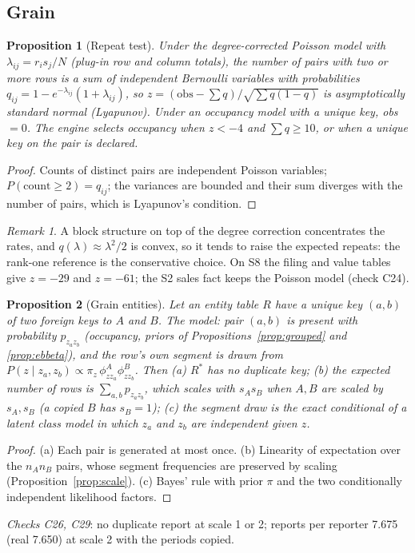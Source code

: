 \documentclass[11pt,a4paper]{article}
\newtheorem{proposition}{Proposition}
\theoremstyle{definition}
\theoremstyle{remark}
\newtheorem{remark}{Remark}
\begin{document}
\subsection{Grain}
\begin{proposition}[Repeat test]\label{prop:repeat}
Under the degree-corrected Poisson model with $\lambda_{ij}=r_is_j/N$ (plug-in row and column totals), the number of pairs with two or more rows is a sum of independent Bernoulli variables with probabilities $q_{ij}=1-e^{-\lambda_{ij}}(1+\lambda_{ij})$, so $z=(\text{obs}-\sum q)/\sqrt{\sum q(1-q)}$ is asymptotically standard normal (Lyapunov). Under an occupancy model with a unique key, obs $=0$. The engine selects occupancy when $z<-4$ and $\sum q\ge10$, or when a unique key on the pair is declared.
\end{proposition}
\begin{proof}
Counts of distinct pairs are independent Poisson variables; $P(\text{count}\ge2)=q_{ij}$; the variances are bounded and their sum diverges with the number of pairs, which is Lyapunov's condition.
\end{proof}
\begin{remark}
A block structure on top of the degree correction concentrates the rates, and $q(\lambda)\approx\lambda^2/2$ is convex, so it tends to raise the expected repeats: the rank-one reference is the conservative choice. On S8 the filing and value tables give $z=-29$ and $z=-61$; the S2 sales fact keeps the Poisson model (check C24).
\end{remark}

\begin{proposition}[Grain entities]\label{prop:grainent}
Let an entity table $R$ have a unique key $(a,b)$ of two foreign keys to $A$ and $B$. The model: pair $(a,b)$ is present with probability $p_{z_az_b}$ (occupancy, priors of Propositions~\ref{prop:grouped} and \ref{prop:ebbeta}), and the row's own segment is drawn from $P(z\mid z_a,z_b)\propto\pi_z\,\phi^A_{z z_a}\phi^B_{z z_b}$. Then (a) $R^*$ has no duplicate key; (b) the expected number of rows is $\sum_{a,b}p_{z_az_b}$, which scales with $s_A s_B$ when $A,B$ are scaled by $s_A,s_B$ (a copied $B$ has $s_B=1$); (c) the segment draw is the exact conditional of a latent class model in which $z_a$ and $z_b$ are independent given $z$.
\end{proposition}
\begin{proof}
(a) Each pair is generated at most once. (b) Linearity of expectation over the $n_An_B$ pairs, whose segment frequencies are preserved by scaling (Proposition~\ref{prop:scale}). (c) Bayes' rule with prior $\pi$ and the two conditionally independent likelihood factors.
\end{proof}
\noindent\emph{Checks C26, C29}: no duplicate report at scale 1 or 2; reports per reporter 7.675 (real 7.650) at scale 2 with the periods copied.
\end{document}

